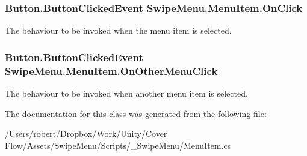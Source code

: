 \subsubsection[{On\+Click}]{\setlength{\rightskip}{0pt plus 5cm}Button.\+Button\+Clicked\+Event Swipe\+Menu.\+Menu\+Item.\+On\+Click}\label{class_swipe_menu_1_1_menu_item_ad4e6de7e233b0bbce78a6451dcf96cfe}


The behaviour to be invoked when the menu item is selected. 

\hypertarget{class_swipe_menu_1_1_menu_item_a58ec333c2619742ea49b3624ba6f9a23}{}
\subsubsection[{On\+Other\+Menu\+Click}]{\setlength{\rightskip}{0pt plus 5cm}Button.\+Button\+Clicked\+Event Swipe\+Menu.\+Menu\+Item.\+On\+Other\+Menu\+Click}\label{class_swipe_menu_1_1_menu_item_a58ec333c2619742ea49b3624ba6f9a23}


The behaviour to be invoked when another menu item is selected. 



The documentation for this class was generated from the following file\+:\begin{DoxyCompactItemize}
\item 
/\+Users/robert/\+Dropbox/\+Work/\+Unity/\+Cover Flow/\+Assets/\+Swipe\+Menu/\+Scripts/\+\_\+\+Swipe\+Menu/Menu\+Item.\+cs\end{DoxyCompactItemize}
